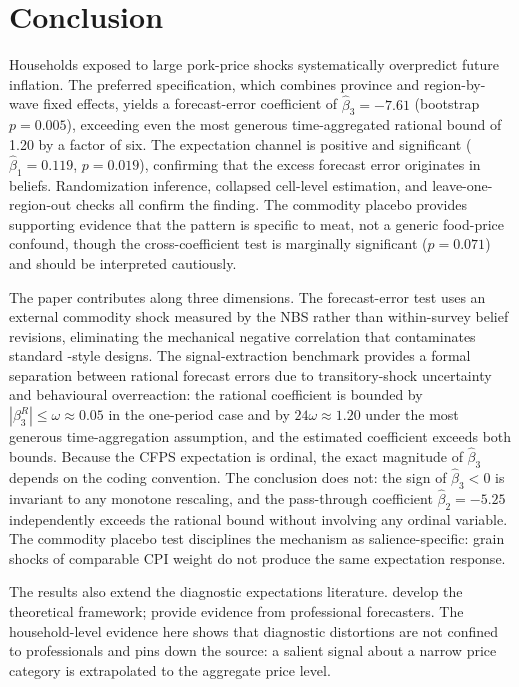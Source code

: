 \section{Conclusion}\label{sec:conclusion}

Households exposed to large pork-price shocks systematically
overpredict future inflation.
The preferred specification, which combines province and
region-by-wave fixed effects, yields a forecast-error
coefficient of $\hat{\beta}_3 = -7.61$ (bootstrap $p = 0.005$),
exceeding even the most generous time-aggregated rational bound
of 1.20 by a factor of six.
The expectation channel is positive and significant
($\hat{\beta}_1 = 0.119$, $p = 0.019$), confirming that the
excess forecast error originates in beliefs.
Randomization inference, collapsed cell-level estimation, and
leave-one-region-out checks all confirm the finding.
The commodity placebo provides supporting evidence that the
pattern is specific to meat, not a generic food-price confound,
though the cross-coefficient test is marginally significant
($p = 0.071$) and should be interpreted cautiously.

The paper contributes along three dimensions.
The forecast-error test uses an external commodity shock
measured by the NBS rather than within-survey belief revisions,
eliminating the mechanical negative correlation that
contaminates standard \citet{Coibion2015}-style designs.
The signal-extraction benchmark provides a formal separation
between rational forecast errors due to transitory-shock
uncertainty and behavioural overreaction: the rational
coefficient is bounded by $|\beta_3^R| \leq \omega \approx
0.05$ in the one-period case and by $24\omega \approx 1.20$
under the most generous time-aggregation assumption, and the
estimated coefficient exceeds both bounds.
Because the CFPS expectation is ordinal, the exact magnitude
of $\hat{\beta}_3$ depends on the coding convention.
The conclusion does not: the sign of $\hat{\beta}_3 < 0$ is
invariant to any monotone rescaling, and the pass-through
coefficient $\hat{\beta}_2 = -5.25$ independently exceeds the
rational bound without involving any ordinal variable.
The commodity placebo test disciplines the mechanism as
salience-specific: grain shocks of comparable CPI weight do
not produce the same expectation response.

The results also extend the diagnostic expectations literature.
\citet{Bordalo2018} develop the theoretical framework;
\citet{Bordalo2020b} provide evidence from professional
forecasters.
The household-level evidence here shows that diagnostic
distortions are not confined to professionals and pins down
the source: a salient signal about a narrow price category
is extrapolated to the aggregate price level.

